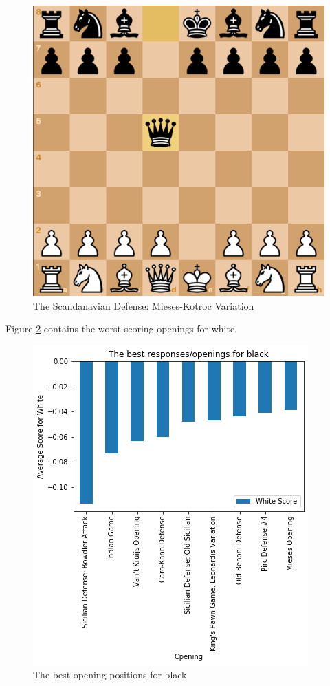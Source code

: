 \documentclass[reprint,
 amsmath,amssymb,nobibnotes,
 aps, floatfix]{revtex4-1}
\begin{document}
\begin{figure}[H]
    \centering
    \includegraphics[scale=.20]{Mieses-Kotroc.png}
    \caption{The Scandanavian Defense: Mieses-Kotroc Variation}
    \label{fig:mieses}
\end{figure}

Figure \ref{fig:black_opening} contains the worst scoring openings for white.

\begin{figure}[h!]
    \centering
    \includegraphics[scale=.5]{openings_black.png}
    \caption{The best opening positions for black}
    \label{fig:black_opening}
\end{figure}
\end{document}
